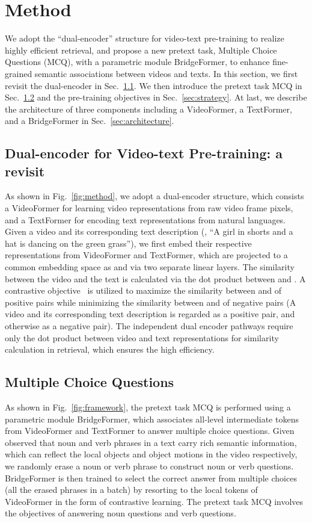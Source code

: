 \documentclass[10pt,twocolumn,letterpaper]{article}
\begin{document}
\section{Method}
We adopt the ``dual-encoder'' structure for video-text pre-training to realize highly efficient retrieval, 
and propose a new pretext task, Multiple Choice Questions (MCQ), with a parametric module BridgeFormer, to enhance fine-grained semantic associations between videos and texts. 
In this section, we first revisit the dual-encoder in Sec.~\ref{sec:revisit }. We then introduce the pretext task MCQ in Sec.~\ref{sec:mcq} and the pre-training objectives in Sec.~\ref{sec:strategy}. At last, we describe the architecture of three components including a VideoFormer, a TextFormer, and a BridgeFormer in Sec.~\ref{sec:architecture}. 

\subsection{Dual-encoder for Video-text Pre-training: a revisit}\label{sec:revisit }
As shown in Fig.~\ref{fig:method}, we adopt a dual-encoder structure, which consists a VideoFormer for learning video representations from raw video frame pixels, and a TextFormer for encoding text representations from natural languages. Given a video and its corresponding text description (\eg, ``A girl in shorts and a hat is dancing on the green grass''), we first embed their respective representations from VideoFormer and TextFormer, which are projected to a common embedding space as  and  via two separate linear layers.
The similarity between the video and the text is calculated via the dot product between  and . A contrastive objective~\cite{contrastive1,contrastive2} is utilized to maximize the similarity between  and  of positive pairs while minimizing the similarity between  and  of negative pairs (A video and its corresponding text description is regarded as a positive pair, and otherwise as a negative pair). The independent dual encoder pathways require only the dot product between video and text representations for similarity calculation in retrieval, which ensures the high efficiency.



\subsection{Multiple Choice Questions}\label{sec:mcq}
As shown in Fig.~\ref{fig:framework}, the pretext task MCQ is performed using a parametric module BridgeFormer, which associates all-level intermediate tokens from VideoFormer and TextFormer to answer multiple choice questions. Given observed that noun and verb phrases in a text carry rich semantic information, which can reflect the local objects and object motions in the video respectively, we randomly erase a noun or verb phrase to construct noun or verb questions. BridgeFormer is then trained to select the correct answer from multiple choices (all the erased phrases in a batch) by resorting to the local tokens of VideoFormer in the form of contrastive learning. The pretext task MCQ involves the objectives of answering noun questions and verb questions.
\end{document}
